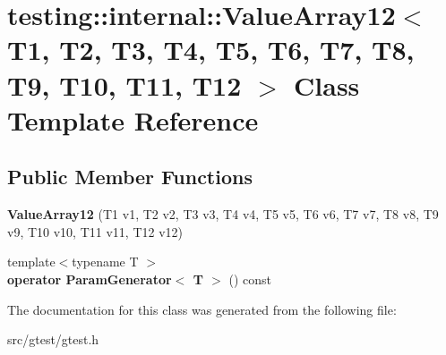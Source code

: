 \hypertarget{classtesting_1_1internal_1_1_value_array12}{}\section{testing\+:\+:internal\+:\+:Value\+Array12$<$ T1, T2, T3, T4, T5, T6, T7, T8, T9, T10, T11, T12 $>$ Class Template Reference}
\label{classtesting_1_1internal_1_1_value_array12}
\subsection*{Public Member Functions}
\begin{DoxyCompactItemize}
\item 
\mbox{\label{classtesting_1_1internal_1_1_value_array12_aaebe12df41b8122fd03f5d6aa1c820a7}} 
{\bfseries Value\+Array12} (T1 v1, T2 v2, T3 v3, T4 v4, T5 v5, T6 v6, T7 v7, T8 v8, T9 v9, T10 v10, T11 v11, T12 v12)
\item 
\mbox{\label{classtesting_1_1internal_1_1_value_array12_acc840a1c32a10ce160731d66c8105e0b}} 
{\footnotesize template$<$typename T $>$ }\\{\bfseries operator Param\+Generator$<$ T $>$} () const
\end{DoxyCompactItemize}


The documentation for this class was generated from the following file\+:\begin{DoxyCompactItemize}
\item 
src/gtest/gtest.\+h\end{DoxyCompactItemize}
